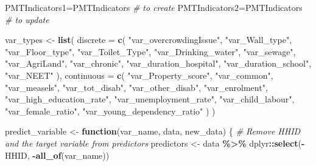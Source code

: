\documentclass[
]{article}
\newenvironment{Shaded}{\begin{snugshade}}{\end{snugshade}}
\newcommand{\AttributeTok}[1]{\textcolor[rgb]{0.13,0.29,0.53}{#1}}
\newcommand{\CommentTok}[1]{\textcolor[rgb]{0.56,0.35,0.01}{\textit{#1}}}
\newcommand{\ControlFlowTok}[1]{\textcolor[rgb]{0.13,0.29,0.53}{\textbf{#1}}}
\newcommand{\FunctionTok}[1]{\textcolor[rgb]{0.13,0.29,0.53}{\textbf{#1}}}
\newcommand{\NormalTok}[1]{#1}
\newcommand{\OtherTok}[1]{\textcolor[rgb]{0.56,0.35,0.01}{#1}}
\newcommand{\SpecialCharTok}[1]{\textcolor[rgb]{0.81,0.36,0.00}{\textbf{#1}}}
\newcommand{\StringTok}[1]{\textcolor[rgb]{0.31,0.60,0.02}{#1}}
\begin{document}
\begin{Shaded}
\begin{Highlighting}[]

\NormalTok{PMTIndicators1}\OtherTok{=}\NormalTok{PMTIndicators }\CommentTok{\# to create}
\NormalTok{PMTIndicators2}\OtherTok{=}\NormalTok{PMTIndicators }\CommentTok{\# to update}

\NormalTok{var\_types }\OtherTok{\textless{}{-}} \FunctionTok{list}\NormalTok{(}
  \AttributeTok{discrete =} \FunctionTok{c}\NormalTok{(}
    \StringTok{"var\_overcrowdingIssue"}\NormalTok{, }\StringTok{"var\_Wall\_type"}\NormalTok{, }\StringTok{"var\_Floor\_type"}\NormalTok{, }
    \StringTok{"var\_Toilet\_Type"}\NormalTok{, }\StringTok{"var\_Drinking\_water"}\NormalTok{, }\StringTok{"var\_sewage"}\NormalTok{,}
    \StringTok{"var\_AgriLand"}\NormalTok{, }\StringTok{"var\_chronic"}\NormalTok{, }\StringTok{"var\_duration\_hospital"}\NormalTok{,}
    \StringTok{"var\_duration\_school"}\NormalTok{, }\StringTok{"var\_NEET"}
\NormalTok{  ),}
  \AttributeTok{continuous =} \FunctionTok{c}\NormalTok{(}
    \StringTok{"var\_Property\_score"}\NormalTok{, }\StringTok{"var\_common"}\NormalTok{, }\StringTok{"var\_measels"}\NormalTok{,}
    \StringTok{"var\_tot\_disab"}\NormalTok{, }\StringTok{"var\_other\_disab"}\NormalTok{, }\StringTok{"var\_enrolment"}\NormalTok{,}
    \StringTok{"var\_high\_education\_rate"}\NormalTok{, }\StringTok{"var\_unemployment\_rate"}\NormalTok{,}
    \StringTok{"var\_child\_labour"}\NormalTok{, }\StringTok{"var\_female\_ratio"}\NormalTok{, }
    \StringTok{"var\_young\_dependency\_ratio"}
\NormalTok{  )}
\NormalTok{)}

\NormalTok{predict\_variable }\OtherTok{\textless{}{-}} \ControlFlowTok{function}\NormalTok{(var\_name, data, new\_data) \{}
  \CommentTok{\# Remove HHID and the target variable from predictors}
\NormalTok{  predictors }\OtherTok{\textless{}{-}}\NormalTok{ data }\SpecialCharTok{\%\textgreater{}\%}\NormalTok{ dplyr}\SpecialCharTok{::}\FunctionTok{select}\NormalTok{(}\SpecialCharTok{{-}}\NormalTok{HHID, }\SpecialCharTok{{-}}\FunctionTok{all\_of}\NormalTok{(var\_name))}
  

\end{Highlighting}
\end{Shaded}
\end{document}
